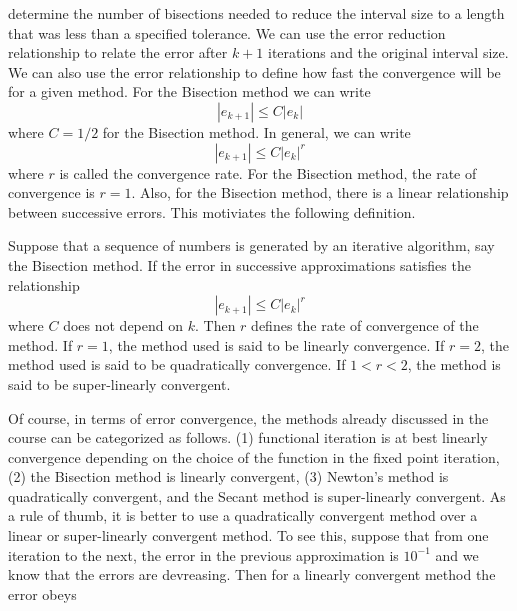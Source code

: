 \documentclass[10pt,fleqn]{article}
\begin{document}
determine the number of bisections needed to reduce the interval size to a
length that was less than a specified tolerance. We can use the error reduction
relationship to relate the error after $k+1$ iterations and the original
interval size. We can also use the error relationship to define how fast the
convergence will be for a given method. For the Bisection method we can write
$$
  | e_{k+1} | \leq C | e_k |
$$
where $C=1/2$ for the Bisection method. In general, we can write
$$
  | e_{k+1} | \leq C | e_k |^r
$$
where $r$ is called the convergence rate. For the Bisection method, the rate of
convergence is $r=1$. Also, for the Bisection method, there is a linear
relationship between successive errors. This motiviates the following
definition.
\begin{definition}
   Suppose that a sequence of numbers is generated by an iterative algorithm,
   say the Bisection method. If the error in successive approximations satisfies
   the relationship
   $$
     | e_{k+1} | \leq C | e_k |^r
   $$
   where $C$ does not depend on $k$. Then $r$ defines the rate of convergence of
   the method. If $r=1$, the method used is said to be linearly convergence. If
   $r=2$, the method used is said to be quadratically convergence. If $1<r<2$,
   the method is said to be super-linearly convergent.
\end{definition}
Of course, in terms of error convergence, the methods already discussed in the
course can be categorized as follows. (1) functional iteration is at best
linearly convergence depending on the choice of the function in the fixed point
iteration, (2) the Bisection method is linearly convergent, (3) Newton's method
is quadratically convergent, and the Secant method is super-linearly convergent.
As a rule of thumb, it is better to use a quadratically convergent method over
a linear or super-linearly convergent method. To see this, suppose that from one
iteration to the next, the error in the previous approximation is $10^{-1}$ and
we know that the errors are devreasing. Then for a linearly convergent method
the error obeys
\end{document}
